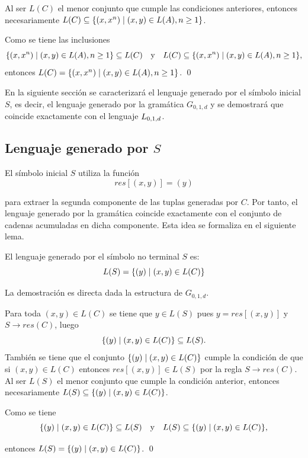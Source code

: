 Al ser $L(C)$ el menor conjunto que cumple las condiciones anteriores, entonces necesariamente $L(C) \subseteq \{(x, x^n) \;|\; (x, y) \in L(A), n \geq 1\}$.

Como se tiene las inclusiones
$$    \{(x, x^n) \;|\; (x, y) \in L(A), n \geq 1\} \subseteq L(C) \quad\text{y} \quad L(C) \subseteq \{(x, x^n) \;|\; (x, y) \in L(A), n \geq 1\},$$ entonces $L(C) = \{(x, x^n) \;|\; (x, y) \in L(A), n \geq 1\}$. \qed

En la siguiente sección se caracterizará el lenguaje generado por el símbolo inicial $S$, es decir, el lenguaje generado por la gramática $G_{0, 1, d}$ y se demostrará que coincide exactamente con el lenguaje $L_{0,1,d}$.

\subsection*{Lenguaje generado por $S$}

El símbolo inicial $S$ utiliza la función
$$
    res[(x, y)] = (y)
$$

para extraer la segunda componente de las tuplas generadas por $C$. Por tanto, el lenguaje generado por la gramática coincide exactamente con el conjunto de cadenas acumuladas en dicha componente. Esta idea se formaliza en el siguiente lema.

\begin{lemma}
    \label{lem:ls}
    El lenguaje generado por el símbolo no terminal $S$ es:
    $$
        L(S) = \{(y) \;|\; (x, y) \in L(C)\}
    $$
\end{lemma}

La demostración es directa dada la estructura de $G_{0, 1, d}$.

Para toda $(x, y) \in L(C)$ se tiene que $y \in L(S)$ pues $y = res[(x, y)]$ y $S \to res(C)$, luego
$$
    \{(y) \;|\; (x, y) \in L(C)\} \subseteq L(S).
$$
También se tiene que el conjunto $\{(y) \;|\; (x, y) \in L(C)\}$ cumple la condición de que si $(x, y) \in L(C)$ entonces $res[(x, y)] \in L(S)$ por la regla $S \to res(C)$. Al ser $L(S)$ el menor conjunto que cumple la condición anterior, entonces necesariamente $L(S) \subseteq \{(y) \;|\; (x, y) \in L(C)\}$.

Como se tiene $$
    \{(y) \;|\; (x, y) \in L(C)\} \subseteq L(S) \quad\text{y}\quad L(S) \subseteq \{(y) \;|\; (x, y) \in L(C)\},
$$

entonces $L(S) = \{(y) \;|\; (x, y) \in L(C)\}$. \qed

